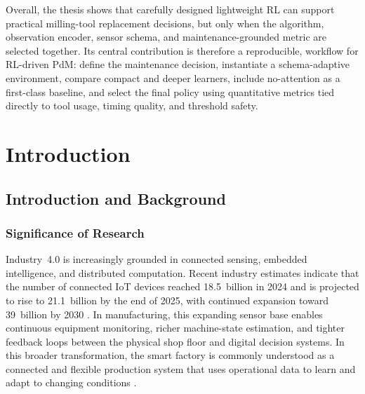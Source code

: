 \documentclass[12pt,oneside]{book}
\begin{document}
Overall, the thesis shows that carefully designed lightweight RL can support practical milling-tool replacement decisions, but only when the algorithm, observation encoder, sensor schema, and maintenance-grounded metric are selected together. Its central contribution is therefore a reproducible, workflow for RL-driven PdM: define the maintenance decision, instantiate a schema-adaptive environment, compare compact and deeper learners, include no-attention as a first-class baseline, and select the final policy using quantitative metrics tied directly to tool usage, timing quality, and threshold safety.

\tableofcontents
\listoffigures
\listoftables

\mainmatter
\onehalfspacing


\chapter{Introduction}\label{ch:introduction}

\section{Introduction and Background}

\subsection{Significance of Research}

Industry~4.0 is increasingly grounded in connected sensing, embedded intelligence, and distributed computation. Recent industry estimates indicate that the number of connected IoT devices reached 18.5~billion in 2024 and is projected to rise to 21.1~billion by the end of 2025, with continued expansion toward 39~billion by 2030 \citep{IoTAnalytics2025}. In manufacturing, this expanding sensor base enables continuous equipment monitoring, richer machine-state estimation, and tighter feedback loops between the physical shop floor and digital decision systems. In this broader transformation, the smart factory is commonly understood as a connected and flexible production system that uses operational data to learn and adapt to changing conditions \citep{Deloitte2025Survey}.
\end{document}
